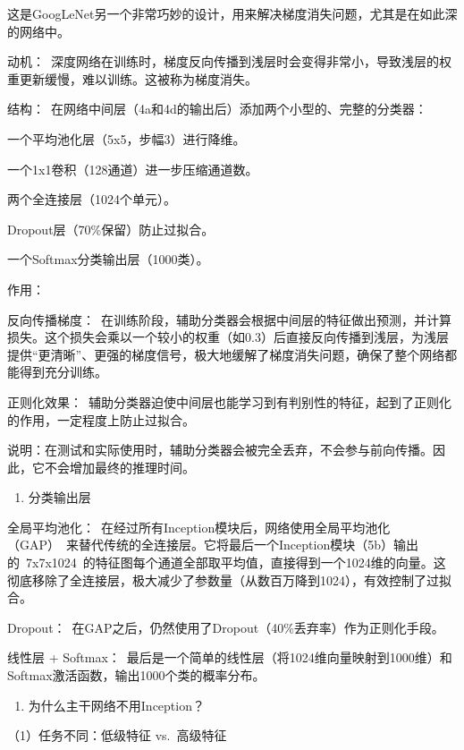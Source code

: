 这是GoogLeNet另一个非常巧妙的设计，用来解决梯度消失问题，尤其是在如此深的网络中。

动机：~深度网络在训练时，梯度反向传播到浅层时会变得非常小，导致浅层的权重更新缓慢，难以训练。这被称为梯度消失。

结构：~在网络中间层（4a和4d的输出后）添加两个小型的、完整的分类器：

一个平均池化层（5x5，步幅3）进行降维。

一个1x1卷积（128通道）进一步压缩通道数。

两个全连接层（1024个单元）。

Dropout层（70\%保留）防止过拟合。

一个Softmax分类输出层（1000类）。

作用：

反向传播梯度：~在训练阶段，辅助分类器会根据中间层的特征做出预测，并计算损失。这个损失会乘以一个较小的权重（如0.3）后直接反向传播到浅层，为浅层提供``更清晰''、更强的梯度信号，极大地缓解了梯度消失问题，确保了整个网络都能得到充分训练。

正则化效果：~辅助分类器迫使中间层也能学习到有判别性的特征，起到了正则化的作用，一定程度上防止过拟合。

说明：在测试和实际使用时，辅助分类器会被完全丢弃，不会参与前向传播。因此，它不会增加最终的推理时间。

\begin{enumerate}
\def\labelenumi{\arabic{enumi}.}
\setcounter{enumi}{3}
\tightlist
\item
  分类输出层
\end{enumerate}

全局平均池化：~在经过所有Inception模块后，网络使用全局平均池化（GAP）~来替代传统的全连接层。它将最后一个Inception模块（5b）输出的~7x7x1024~的特征图每个通道全部取平均值，直接得到一个1024维的向量。这彻底移除了全连接层，极大减少了参数量（从数百万降到1024），有效控制了过拟合。

Dropout：~在GAP之后，仍然使用了Dropout（40\%丢弃率）作为正则化手段。

线性层 + Softmax：~最后是一个简单的线性层（将1024维向量映射到1000维）和Softmax激活函数，输出1000个类的概率分布。

\begin{enumerate}
\def\labelenumi{\arabic{enumi}.}
\setcounter{enumi}{4}
\tightlist
\item
  为什么主干网络不用Inception？
\end{enumerate}

（1）任务不同：低级特征 vs.~高级特征

